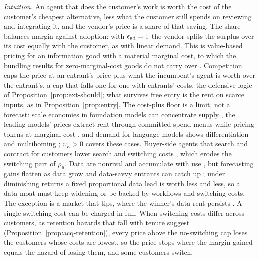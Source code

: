 \noindent\emph{Intuition.} An agent that does the customer's work is worth the cost of the customer's cheapest alternative, less what the customer still spends on reviewing and integrating it, and the vendor's price is a share of that saving. The share balances margin against adoption: with $\epsilon_{\rm ad}=1$ the vendor splits the surplus over its cost equally with the customer, as with linear demand. This is value-based pricing \citep{hinterhuber2004towards} for an information good with a material marginal cost, to which the bundling results for zero-marginal-cost goods do not carry over \citep{shapiro1999information,bakos1999bundling}. Competition caps the price at an entrant's price plus what the incumbent's agent is worth over the entrant's, a cap that falls one for one with entrants' costs, the defensive logic of Proposition~\ref{prop:ext-should}; what survives free entry is the rent on scarce inputs, as in Proposition~\ref{prop:entry}. The cost-plus floor is a limit, not a forecast: scale economies in foundation models can concentrate supply \citep{korinek2025concentrating,gans2024market}, the leading models' prices extract rent through committed-spend menus while pricing tokens at marginal cost \citep{bergemann2025menu}, and demand for language models shows differentiation and multihoming \citep{fradkin2025demand}; $\upsilon_E>0$ covers these cases. Buyer-side agents that search and contract for customers lower search and switching costs \citep{shahidi2025coasean}, which erodes the switching part of $\rho_u$. Data are nonrival and accumulate with use \citep{jones2020nonrivalry,farboodi2021model,farboodi2023data}, but forecasting gains flatten as data grow \citep{bajari2019impact} and data-savvy entrants can catch up \citep{farboodi2019big,hagiu2023data}; under diminishing returns a fixed proportional data lead is worth less and less, so a data moat must keep widening or be backed by workflows and switching costs. The exception is a market that tips, where the winner's data rent persists \citep{prufer2021competing}. A single switching cost can be charged in full. When switching costs differ across customers, as retention hazards that fall with tenure suggest (Proposition~\ref{prop:acq-retention}), every price above the no-switching cap loses the customers whose costs are lowest, so the price stops where the margin gained equals the hazard of losing them, and some customers switch.

